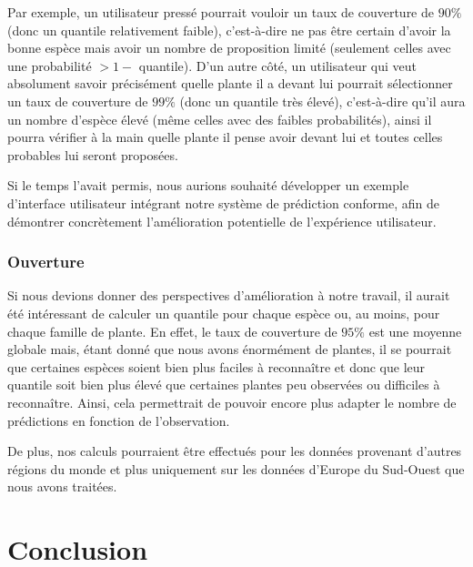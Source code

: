 \documentclass[a4paper,12pt]{article}
\begin{document}
\vspace{0.2cm}

Par exemple, un utilisateur pressé pourrait vouloir un taux de couverture de $90\%$ (donc un quantile relativement faible), c'est-à-dire ne pas être certain d'avoir la bonne espèce mais avoir un nombre de proposition limité (seulement celles avec une probabilité $> 1 -$ quantile). D'un autre côté, un utilisateur qui veut absolument savoir précisément quelle plante il a devant lui pourrait sélectionner un taux de couverture de $99\%$ (donc un quantile très élevé), c'est-à-dire qu'il aura un nombre d'espèce élevé (même celles avec des faibles probabilités), ainsi il pourra vérifier à la main quelle plante il pense avoir devant lui et toutes celles probables lui seront proposées.

\vspace{0.2cm}

Si le temps l'avait permis, nous aurions souhaité développer un exemple d'interface utilisateur intégrant notre système de prédiction conforme, afin de démontrer concrètement l'amélioration potentielle de l'expérience utilisateur.

\subsubsection{Ouverture}

Si nous devions donner des perspectives d'amélioration à notre travail, il aurait été intéressant de calculer un quantile pour chaque espèce ou, au moins, pour chaque famille de plante. En effet, le taux de couverture de $95\%$ est une moyenne globale mais, étant donné que nous avons énormément de plantes, il se pourrait que certaines espèces soient bien plus faciles à reconnaître et donc que leur quantile soit bien plus élevé que certaines plantes peu observées ou difficiles à reconnaître. Ainsi, cela permettrait de pouvoir encore plus adapter le nombre de prédictions en fonction de l'observation.

\vspace{0.2cm}

De plus, nos calculs pourraient être effectués pour les données provenant d'autres régions du monde et plus uniquement sur les données d'Europe du Sud-Ouest que nous avons traitées.


\section{Conclusion}
\end{document}
